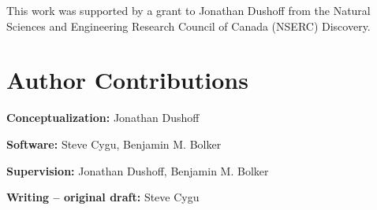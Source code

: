 \documentclass[10pt,letterpaper]{article}
\begin{document}
This work was supported by a grant to Jonathan Dushoff from the Natural Sciences and Engineering Research Council of Canada (NSERC) Discovery.

\section*{Author Contributions}

\textbf{Conceptualization:} Jonathan Dushoff

\noindent\textbf{Software:} Steve Cygu, Benjamin M. Bolker

\noindent\textbf{Supervision:} Jonathan Dushoff, Benjamin M. Bolker

\noindent\textbf{Writing – original draft:} Steve Cygu




\nolinenumbers

%
%
% 


\end{document}
